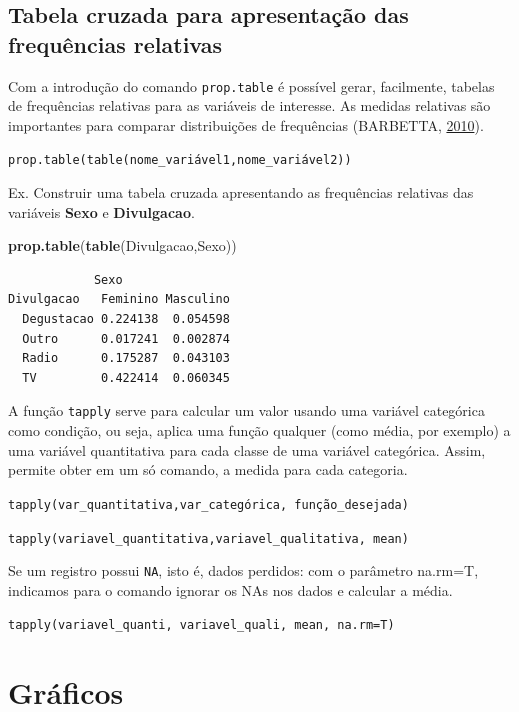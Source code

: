 \documentclass[12pt,brazil,oneside]{book}
\newenvironment{Shaded}{\begin{snugshade}}{\end{snugshade}}
\newcommand{\KeywordTok}[1]{\textcolor[rgb]{0.13,0.29,0.53}{\textbf{#1}}}
\newcommand{\NormalTok}[1]{#1}
\begin{document}
\hypertarget{tabela-cruzada-para-apresentacao-das-frequencias-relativas}{%
\subsection{Tabela cruzada para apresentação das frequências
relativas}\label{tabela-cruzada-para-apresentacao-das-frequencias-relativas}}

Com a introdução do comando \texttt{prop.table} é possível gerar,
facilmente, tabelas de frequências relativas para as variáveis de
interesse. As medidas relativas são importantes para comparar
distribuições de frequências (BARBETTA,
\protect\hyperlink{ref-barbetta1988}{2010}).

\texttt{prop.table(table(nome\_variável1,nome\_variável2))}

Ex. Construir uma tabela cruzada apresentando as frequências relativas
das variáveis \textbf{Sexo} e \textbf{Divulgacao}.

\begin{Shaded}
\begin{Highlighting}[]
\KeywordTok{prop.table}\NormalTok{(}\KeywordTok{table}\NormalTok{(Divulgacao,Sexo))}
\end{Highlighting}
\end{Shaded}

\begin{verbatim}
            Sexo
Divulgacao   Feminino Masculino
  Degustacao 0.224138  0.054598
  Outro      0.017241  0.002874
  Radio      0.175287  0.043103
  TV         0.422414  0.060345
\end{verbatim}

A função \texttt{tapply} serve para calcular um valor usando uma
variável categórica como condição, ou seja, aplica uma função qualquer
(como média, por exemplo) a uma variável quantitativa para cada classe
de uma variável categórica. Assim, permite obter em um só comando, a
medida para cada categoria.

\texttt{tapply(var\_quantitativa,var\_categórica,\ função\_desejada)}

\texttt{tapply(variavel\_quantitativa,variavel\_qualitativa,\ mean)}

Se um registro possui \texttt{NA}, isto é, dados perdidos: com o
parâmetro na.rm=T, indicamos para o comando ignorar os NAs nos dados e
calcular a média.

\texttt{tapply(variavel\_quanti,\ variavel\_quali,\ mean,\ na.rm=T)}

\hypertarget{graficos}{%
\section{Gráficos}\label{graficos}}
\end{document}
